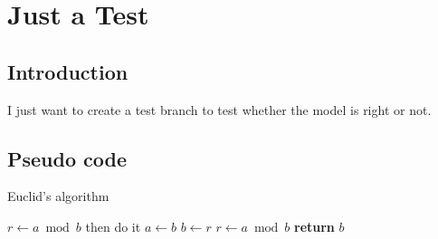 \documentclass[cs4size, punct, nospace, fancyhdr, fntef]{ctexart}
\begin{document}
  \section{Just a Test}

  \subsection{Introduction}
    I just want to create a test branch to test whether the model is right or not.
  \subsection{Pseudo code}
    \begin{algorithm}
    \caption{Euclid's algorithm}\label{euclid}
    \begin{algorithmic}[1]
      \State $r\gets a\bmod b$
        \State then do it
      \EndIf
        \State $a\gets b$
        \State $b\gets r$
        \State $r\gets a\bmod b$
      \EndWhile\label{euclidendwhile}
      \State \textbf{return} $b$
    \EndProcedure
    \end{algorithmic}
    \end{algorithm}
\end{document}
